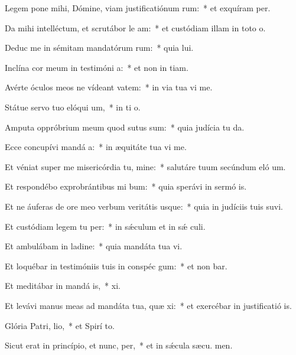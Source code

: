 \item Legem pone mihi, Dómine, viam justificatiónum rum:~* et exquíram  per.
\item Da mihi intelléctum, et scrutábor le am:~* et custódiam illam in toto  o.
\item Deduc me in sémitam mandatórum rum:~* quia  lui.
\item Inclína cor meum in testimóni a:~* et non in tiam.
\item Avérte óculos meos ne vídeant vatem:~* in via tua vi me.
\item Státue servo tuo elóqui um,~* in ti o.
\item Amputa oppróbrium meum quod sutus sum:~* quia judícia tu da.
\item Ecce concupívi mandá a:~* in æquitáte tua vi me.
\item Et véniat super me misericórdia tu, mine:~* salutáre tuum secúndum eló um.
\item Et respondébo exprobrántibus mi bum:~* quia sperávi in sermó is.
\item Et ne áuferas de ore meo verbum veritátis usque:~* quia in judíciis tuis suvi.
\item Et custódiam legem tu per:~* in sǽculum et in sǽ culi.
\item Et ambulábam in ladine:~* quia mandáta tua vi.
\item Et loquébar in testimóniis tuis in conspéc gum:~* et non bar.
\item Et meditábar in mandá is,~*  xi.
\item Et levávi manus meas ad mandáta tua, quæ xi:~* et exercébar in justificatió is.
\item Glória Patri,  lio,~* et Spirí to.
\item Sicut erat in princípio, et nunc,  per,~* et in sǽcula sæcu. men.

